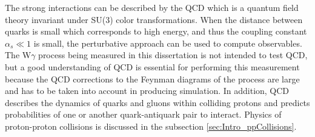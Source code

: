 The strong interactions can be described by the QCD which is a quantum field theory invariant under SU(3) color transformations. When the distance between quarks is small which corresponds to high energy, and thus the coupling constant $\alpha_s \ll 1$ is small, the perturbative approach can be used to compute observables.\\

The W$\gamma$ process being measured in this dissertation is not intended to test QCD, but a good understanding of QCD is essential for performing this measurement because the QCD corrections to the Feynman diagrams of the process are large and has to be taken into account in producing simulation. In addition, QCD describes the dynamics of quarks and gluons within colliding protons and predicts probabilities of one or another quark-antiquark pair to interact. Physics of proton-proton collisions is discussed in the subsection \ref{sec:Intro_ppCollisions}. \\

